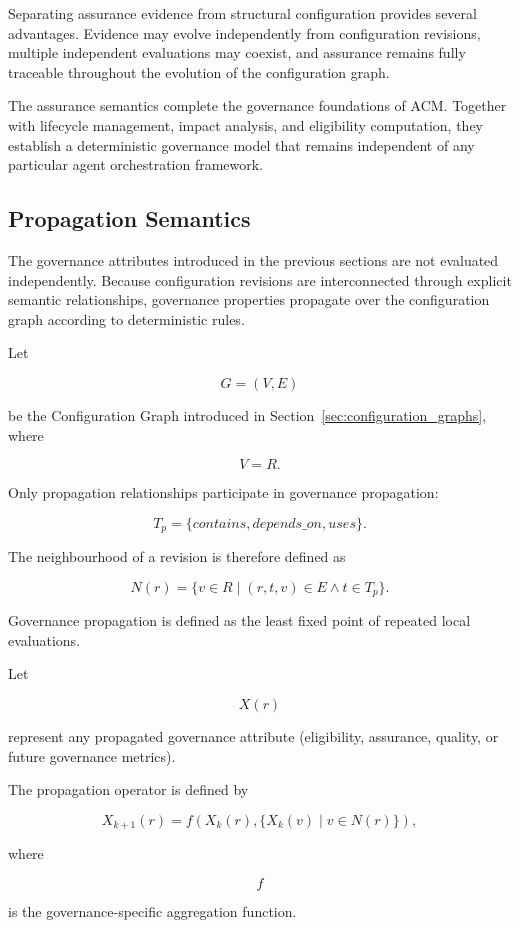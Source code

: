 \documentclass[10pt]{article}
\begin{document}
Separating assurance evidence from structural configuration provides several advantages. Evidence may evolve independently from configuration revisions, multiple independent evaluations may coexist, and assurance remains fully traceable throughout the evolution of the configuration graph.

The assurance semantics complete the governance foundations of ACM. Together with lifecycle management, impact analysis, and eligibility computation, they establish a deterministic governance model that remains independent of any particular agent orchestration framework.


\subsection{Propagation Semantics}
\label{sec:propagation}

The governance attributes introduced in the previous sections are not evaluated independently. Because configuration revisions are interconnected through explicit semantic relationships, governance properties propagate over the configuration graph according to deterministic rules.

Let

\[
G=(V,E)
\]

be the Configuration Graph introduced in Section~\ref{sec:configuration_graphs}, where

\[
V=R.
\]

Only propagation relationships participate in governance propagation:

\[
T_p=
\{
contains,
depends\_on,
uses
\}.
\]

The neighbourhood of a revision is therefore defined as

\[
N(r)
=
\{
v
\in
R
\mid
(r,t,v)\in E
\land
t\in T_p
\}.
\]

Governance propagation is defined as the least fixed point of repeated local evaluations.

Let

\[
X(r)
\]

represent any propagated governance attribute (eligibility, assurance, quality, or future governance metrics).

The propagation operator is defined by

\[
X_{k+1}(r)
=
f
\left(
X_k(r),
\{
X_k(v)
\mid
v\in N(r)
\}
\right),
\]

where

\[
f
\]

is the governance-specific aggregation function.
\end{document}
